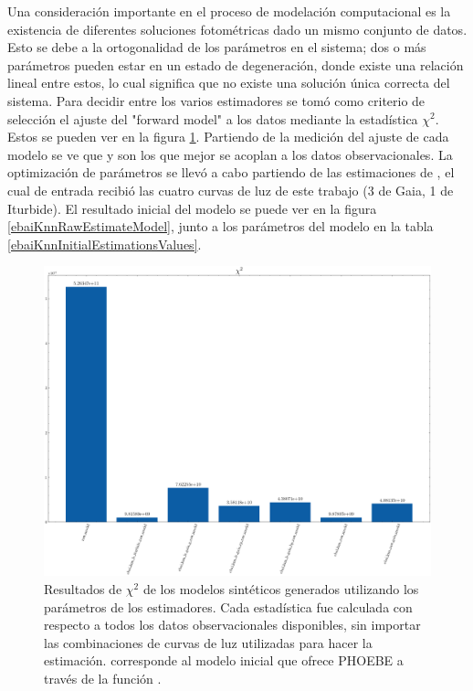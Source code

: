 Una consideración importante en el proceso de modelación computacional es la
existencia de diferentes soluciones fotométricas dado un mismo conjunto de
datos. Esto se debe a la ortogonalidad de los parámetros en el sistema; dos o
más parámetros pueden estar en un estado de degeneración, donde existe una
relación lineal entre estos, lo cual significa que no existe una solución única
correcta del sistema. Para decidir entre los varios estimadores se tomó como
criterio de selección el ajuste del "forward model" a los datos mediante la
estadística $\chi^2$. Estos se pueden ver en la figura \ref{chiSqrdFigure}.
Partiendo de la medición del ajuste de cada modelo se ve que
 y  son los que mejor se
acoplan a los datos observacionales. La optimización de parámetros se llevó a
cabo partiendo de las estimaciones de , el cual de entrada
recibió las cuatro curvas de luz de este trabajo (3 de Gaia, 1 de Iturbide). El
resultado inicial del modelo se puede ver en la figura
\ref{ebaiKnnRawEstimateModel}, junto a los parámetros del modelo en la tabla \ref{ebaiKnnInitialEstimationsValues}.

\begin{figure}[!ht]
	\centering
	\includegraphics[scale=0.43]{Metodologia/Secciones/ModeloComputacional/Figures/EstimadoresChiResultados.png}
	
	\caption{Resultados de $\chi^2$ de los modelos sintéticos generados
	utilizando los parámetros de los estimadores. Cada estadística fue calculada
	con respecto a todos los datos observacionales disponibles, sin importar las
	combinaciones de curvas de luz utilizadas para hacer la estimación.
	 corresponde al modelo inicial que ofrece PHOEBE a través de
	la función .} 
	\label{chiSqrdFigure}
\end{figure}

